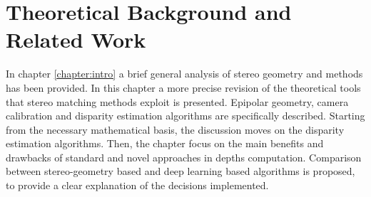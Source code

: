 \chapter{Theoretical Background and Related Work}
\label{chapter:background} 

In chapter \ref{chapter:intro} a brief general analysis of stereo geometry and methods has been provided. 
In this chapter a more precise revision of the theoretical tools that stereo matching methods exploit is presented.
Epipolar geometry, camera calibration and disparity estimation algorithms are specifically described. 
Starting from the necessary mathematical basis, the discussion moves on the disparity estimation algorithms. 
Then, the chapter focus on the main benefits and drawbacks of standard and novel approaches in depths computation.
Comparison between stereo-geometry based and deep learning based algorithms is proposed, to provide a clear explanation of the decisions implemented. 


